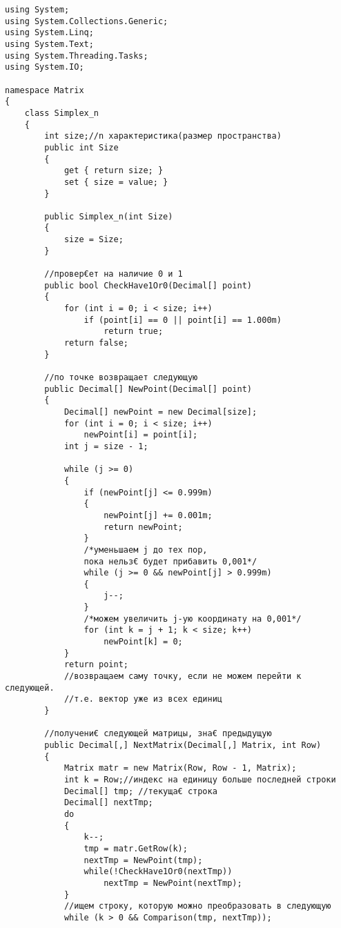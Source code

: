 \documentclass[12pt]{article} %
\begin{document}
\begin{verbatim}
using System;
using System.Collections.Generic;
using System.Linq;
using System.Text;
using System.Threading.Tasks;
using System.IO;

namespace Matrix
{
    class Simplex_n
    {
        int size;//n характеристика(размер пространства)
        public int Size
        {
            get { return size; }
            set { size = value; }
        }

        public Simplex_n(int Size)
        {
            size = Size;
        }

        //провер€ет на наличие 0 и 1
        public bool CheckHave1Or0(Decimal[] point)
        {
            for (int i = 0; i < size; i++)
                if (point[i] == 0 || point[i] == 1.000m)
                    return true;
            return false;
        }
        
        //по точке возвращает следующую
        public Decimal[] NewPoint(Decimal[] point)
        {
            Decimal[] newPoint = new Decimal[size];
            for (int i = 0; i < size; i++)
                newPoint[i] = point[i];
            int j = size - 1;

            while (j >= 0)
            {
                if (newPoint[j] <= 0.999m)
                {
                    newPoint[j] += 0.001m;
                    return newPoint;
                }
                /*уменьшаем j до тех пор,
                пока нельз€ будет прибавить 0,001*/
                while (j >= 0 && newPoint[j] > 0.999m) 
                {
                    j--;
                }
                /*можем увеличить j-ую координату на 0,001*/
                for (int k = j + 1; k < size; k++)
                    newPoint[k] = 0;
            }
            return point;
            //возвращаем саму точку, если не можем перейти к следующей.
            //т.е. вектор уже из всех единиц
        }

        //получени€ следующей матрицы, зна€ предыдущую
        public Decimal[,] NextMatrix(Decimal[,] Matrix, int Row)
        {
            Matrix matr = new Matrix(Row, Row - 1, Matrix);
            int k = Row;//индекс на единицу больше последней строки
            Decimal[] tmp; //текуща€ строка
            Decimal[] nextTmp;
            do
            {
                k--;
                tmp = matr.GetRow(k);
                nextTmp = NewPoint(tmp);
                while(!CheckHave1Or0(nextTmp))
                    nextTmp = NewPoint(nextTmp);
            }
            //ищем строку, которую можно преобразовать в следующую
            while (k > 0 && Comparison(tmp, nextTmp));


\end{verbatim}
\end{document}
